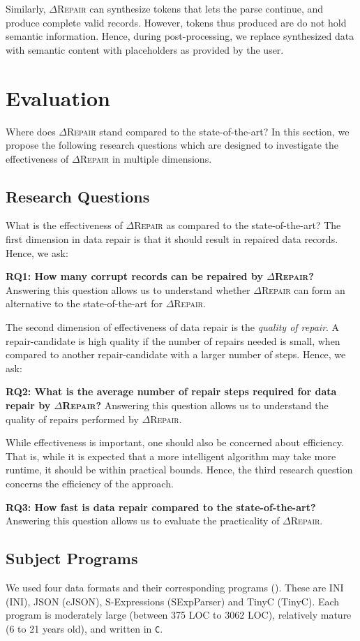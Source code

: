 \documentclass[acmsmall,screen,review,anonymous]{acmart}
\newcommand{\dtask}{data repair\xspace}
\newcommand{\approach}{\textsc{$\Delta$Repair}\xspace}
\newcommand{\drepair}{\approach}
\def\<#1>{\texttt{#1}}
\begin{document}
Similarly,
\drepair can synthesize tokens that lets the parse continue, and produce
complete valid records. However, tokens thus produced are do not hold semantic information.
Hence, during post-processing, we replace synthesized data with semantic content
with placeholders as provided by the user.

\section{Evaluation}
\label{sec:evaluation}
Where does \drepair stand compared to the state-of-the-art? In this section, we
propose the following research questions which are designed to investigate the
effectiveness of \drepair in multiple dimensions.

\subsection{Research Questions}
What is the effectiveness of \drepair as compared to the state-of-the-art?
The first dimension in \dtask is that it should result in repaired data records.
Hence, we ask:

\noindent\textbf{RQ1: How many corrupt records can be repaired by \drepair?} Answering this
question allows us to understand whether \drepair can form an alternative to the
state-of-the-art for \drepair.

The second dimension of effectiveness of \dtask is the \emph{quality of repair}.
A repair-candidate is high quality if the number of repairs needed is small,
when compared to another repair-candidate with a larger number of steps.
Hence, we ask:

\noindent\textbf{RQ2: What is the average number of repair steps required for \dtask by \drepair?}
Answering this question allows us to understand the quality of repairs
performed by \drepair.

While effectiveness is important, one should also be concerned about efficiency.
That is, while it is expected that a more intelligent algorithm may take more
runtime, it should be within practical bounds. Hence, the third research
question concerns the efficiency of the approach.

\noindent\textbf{RQ3: How fast is \dtask compared to the state-of-the-art?}
Answering this question allows us to evaluate the practicality of \drepair.


\subsection{Subject Programs} %

We used four data formats and their corresponding programs (). These are INI (INI), JSON (cJSON), S-Expressions (SExpParser) and TinyC (TinyC). Each program is moderately large (between 375 LOC to 3062 LOC), relatively mature (6 to 21 years old), and written in \<C>.
\end{document}
